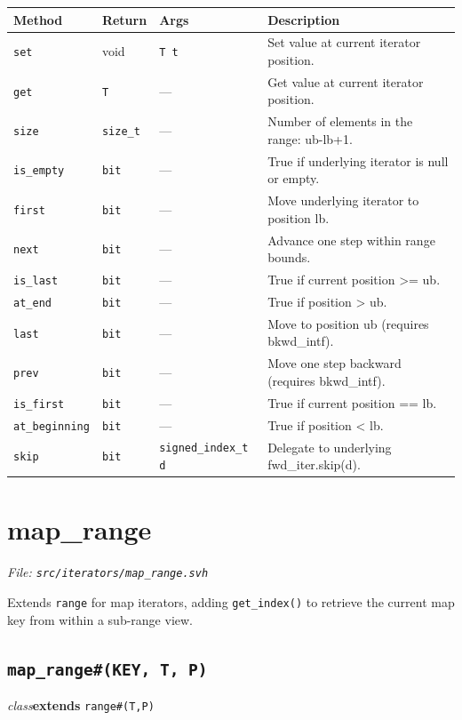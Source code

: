 \documentclass[11pt,letterpaper]{report}
\begin{document}
\begin{xltabular}{\linewidth}{>{\small}p{1.35in} >{\small}p{1.25in} >{\small}p{0.95in} >{\small}X}
\toprule
\textbf{Method} & \textbf{Return} & \textbf{Args} & \textbf{Description} \\
\midrule
\endhead
\bottomrule
\endfoot
\texttt{set} & void & \texttt{T t} & Set value at current iterator position. \\
\texttt{get} & \texttt{T} & --- & Get value at current iterator position. \\
\texttt{size} & \texttt{size\_t} & --- & Number of elements in the range: ub-lb+1. \\
\texttt{is\_empty} & \texttt{bit} & --- & True if underlying iterator is null or empty. \\
\texttt{first} & \texttt{bit} & --- & Move underlying iterator to position lb. \\
\texttt{next} & \texttt{bit} & --- & Advance one step within range bounds. \\
\texttt{is\_last} & \texttt{bit} & --- & True if current position \textgreater{}= ub. \\
\texttt{at\_end} & \texttt{bit} & --- & True if position \textgreater{} ub. \\
\texttt{last} & \texttt{bit} & --- & Move to position ub (requires bkwd\_intf). \\
\texttt{prev} & \texttt{bit} & --- & Move one step backward (requires bkwd\_intf). \\
\texttt{is\_first} & \texttt{bit} & --- & True if current position == lb. \\
\texttt{at\_beginning} & \texttt{bit} & --- & True if position \textless{} lb. \\
\texttt{skip} & \texttt{bit} & \texttt{signed\_index\_t d} & Delegate to underlying fwd\_iter.skip(d). \\
\end{xltabular}

\section{map\_range}
\noindent\small\textit{File: \texttt{src/iterators/map\_range.svh}}\par

Extends \texttt{range} for map iterators, adding \texttt{get\_index()} to retrieve the current map key from within a sub-range view.

\subsection*{\texttt{map\_range\#(KEY, T, P)}}
\noindent\small\textit{class}\quad \textbf{extends} \texttt{range\#(T,P)}\par
\end{document}
